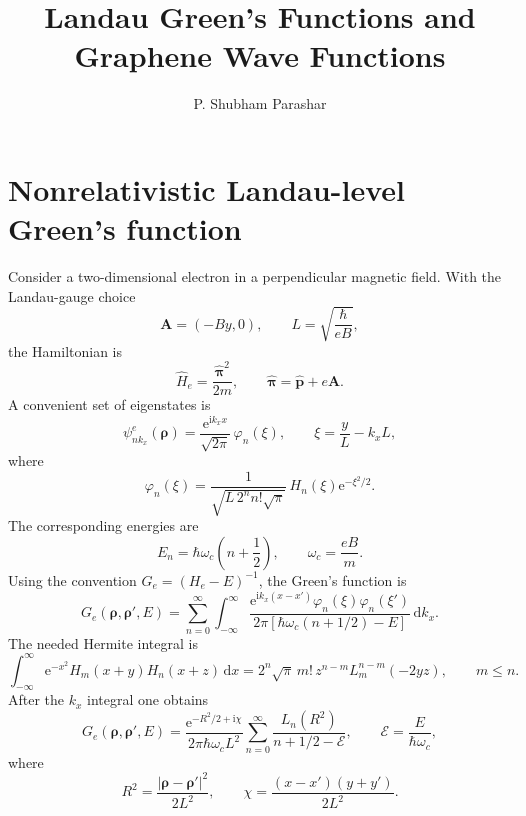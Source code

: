 \documentclass[11pt]{article}
\title{Landau Green's Functions and Graphene Wave Functions}
\author{P. Shubham Parashar}
\date{}
\newcommand{\dd}{\,\mathrm d}
\newcommand{\ii}{\mathrm i}
\newcommand{\ee}{\mathrm e}
\newcommand{\brho}{\bm{\rho}}
\newcommand{\bpi}{\bm{\pi}}
\begin{document}
\maketitle

\section{Nonrelativistic Landau-level Green's function}

Consider a two-dimensional electron in a perpendicular magnetic field. With the Landau-gauge choice
\begin{equation}
  \bm A=(-By,0), \qquad L=\sqrt{\frac{\hbar}{eB}},
\end{equation}
the Hamiltonian is
\begin{equation}
  \hat H_e=\frac{\hat{\bpi}^{2}}{2m}, \qquad \hat{\bpi}=\hat{\bm p}+e\bm A .
\end{equation}
A convenient set of eigenstates is
\begin{equation}
  \psi^e_{n k_x}(\brho)=\frac{\ee^{\ii k_x x}}{\sqrt{2\pi}}\,\varphi_n(\xi),
  \qquad \xi=\frac{y}{L}-k_xL,
\end{equation}
where
\begin{equation}
  \varphi_n(\xi)=\frac{1}{\sqrt{L\,2^n n!\sqrt\pi}}\,H_n(\xi)\ee^{-\xi^2/2}.
\end{equation}
The corresponding energies are
\begin{equation}
  E_n=\hbar\omega_c\left(n+\frac12\right), \qquad \omega_c=\frac{eB}{m}.
\end{equation}
Using the convention \(G_e=(H_e-E)^{-1}\), the Green's function is
\begin{equation}
  G_e(\brho,\brho',E)=
  \sum_{n=0}^{\infty}\int_{-\infty}^{\infty}
  \frac{\ee^{\ii k_x(x-x')}\varphi_n(\xi)\varphi_n(\xi')}
       {2\pi[\hbar\omega_c(n+1/2)-E]}\dd k_x .
\end{equation}
The needed Hermite integral is
\begin{equation}
  \int_{-\infty}^{\infty}\ee^{-x^2}H_m(x+y)H_n(x+z)\dd x
  =2^n\sqrt\pi\,m!\,z^{n-m}L_m^{n-m}(-2yz), \qquad m\le n .
\end{equation}
After the \(k_x\) integral one obtains
\begin{equation}
  G_e(\brho,\brho',E)=
  \frac{\ee^{-R^2/2+\ii\chi}}{2\pi\hbar\omega_cL^2}
  \sum_{n=0}^{\infty}\frac{L_n(R^2)}{n+1/2-\mathcal E},
  \qquad \mathcal E=\frac{E}{\hbar\omega_c},
\end{equation}
where
\begin{equation}
  R^2=\frac{|\brho-\brho'|^2}{2L^2},
  \qquad
  \chi=\frac{(x-x')(y+y')}{2L^2}.
\end{equation}
\end{document}
